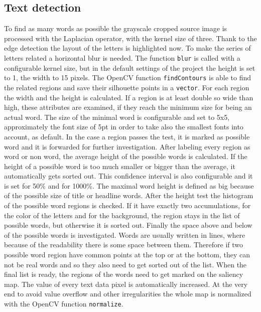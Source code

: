 \documentclass[draft,final]{vutinfth} %
\begin{document}
\subsection{Text detection}
To find as many words as possible the grayscale cropped source image is processed with the Laplacian operator, with the kernel size of three.
Thank to the edge detection the layout of the letters is highlighted now.
To make the series of letters related a horizontal blur is needed.
The function \texttt{blur} is called with a configurable kernel size, but in the default settings of the project the height is set to 1, the width to 15 pixels.
The OpenCV function  \texttt{findContours} is able to find the related regions and save their silhouette points in a \texttt{vector}.
For each region the width and the height is calculated.
If a region is at least double so wide than high, these attributes are examined, if they reach the minimum size for being an actual word.
The size of the minimal word is configurable and set to 5x5, approximately the font size of 5pt in order to take also the smallest fonts into account, as default.
In the case a region passes the test, it is marked as possible word and it is forwarded for further investigation.
After labeling every region as word or non word, the average height of the possible words is calculated.
If the height of a possible word is too much smaller or bigger than the average, it automatically gets sorted out.
This confidence interval is also configurable and it is set for 50\% and for 1000\%. 
The maximal word height is defined as big because of the possible size of title or headline words.
After the height test the histogram of the possible word regions is checked.
If it have exactly two accumulations, for the color of the letters and for the background, the region stays in the list of possible words, but otherwise it is sorted out.
Finally the space above and below of the possible words is investigated.
Words are usually written in lines, where because of the readability there is some space between them.
Therefore if two possible word region have common points at the top or at the bottom, they can not be real words and so they also need to get sorted out of the list.
When the final list is ready, the regions of the words need to get marked on the saliency map.
The value of every text data pixel is automatically increased.
At the very end to avoid value overflow and other irregularities the whole map is normalized with the OpenCV function \texttt{normalize}.  
\end{document}
